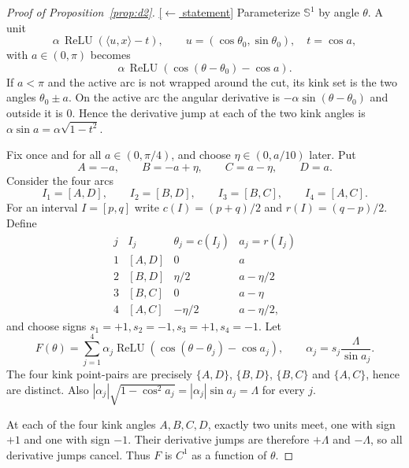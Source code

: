 \documentclass[11pt,reqno]{amsart}
\theoremstyle{plain}
\theoremstyle{definition}
\theoremstyle{remark}
\newcommand{\relu}{\operatorname{ReLU}}
\newcommand{\inn}[2]{\langle #1,#2\rangle}
\newcommand{\stmtbutton}[1]{\hyperref[#1]{\textnormal{\footnotesize\textsf{[$\leftarrow$ statement]}}}}
\begin{document}
\begin{proof}[Proof of Proposition~\textup{\ref{prop:d2}}]\label{proof:d2}\stmtbutton{prop:d2}
Parameterize $\mathbb S^1$ by angle $\theta$.  A unit
\[
        \alpha\,\relu(\inn{u}{x}-t),\qquad u=(\cos\theta_0,\sin\theta_0),\quad t=\cos a,
\]
with $a\in(0,\pi)$ becomes
\[
        \alpha\,\relu(\cos(\theta-\theta_0)-\cos a).
\]
If $a<\pi$ and the active arc is not wrapped around the cut, its kink set is the two angles $\theta_0\pm a$.  On the active arc the angular derivative is $-\alpha\sin(\theta-\theta_0)$ and outside it is $0$.  Hence the derivative jump at each of the two kink angles is $\alpha\sin a=\alpha\sqrt{1-t^2}$.

Fix once and for all $a\in(0,\pi/4)$, and choose $\eta\in(0,a/10)$ later.  Put
\[
        A=-a,\qquad B=-a+\eta,\qquad C=a-\eta,\qquad D=a.
\]
Consider the four arcs
\[
        I_1=[A,D],\qquad I_2=[B,D],\qquad I_3=[B,C],\qquad I_4=[A,C].
\]
For an interval $I=[p,q]$ write $c(I)=(p+q)/2$ and $r(I)=(q-p)/2$.  Define
\[
\begin{array}{c|c|c|c}
 j & I_j & \theta_j=c(I_j) & a_j=r(I_j) \\
\hline
 1 &[A,D] & 0 & a\\
 2 &[B,D] & \eta/2 & a-\eta/2\\
 3 &[B,C] & 0 & a-\eta\\
 4 &[A,C] & -\eta/2 & a-\eta/2,
\end{array}
\]
and choose signs $s_1=+1,s_2=-1,s_3=+1,s_4=-1$.  Let
\[
        F(\theta)=\sum_{j=1}^4 \alpha_j\relu(\cos(\theta-\theta_j)-\cos a_j),
        \qquad \alpha_j=s_j\frac{\Lambda}{\sin a_j}.
\]
The four kink point-pairs are precisely $\{A,D\}$, $\{B,D\}$, $\{B,C\}$ and $\{A,C\}$, hence are distinct.  Also $|\alpha_j|\sqrt{1-\cos^2 a_j}=|\alpha_j|\sin a_j=\Lambda$ for every $j$.

At each of the four kink angles $A,B,C,D$, exactly two units meet, one with sign $+1$ and one with sign $-1$.  Their derivative jumps are therefore $+\Lambda$ and $-\Lambda$, so all derivative jumps cancel.  Thus $F$ is $C^1$ as a function of $\theta$.


\end{proof}
\end{document}
